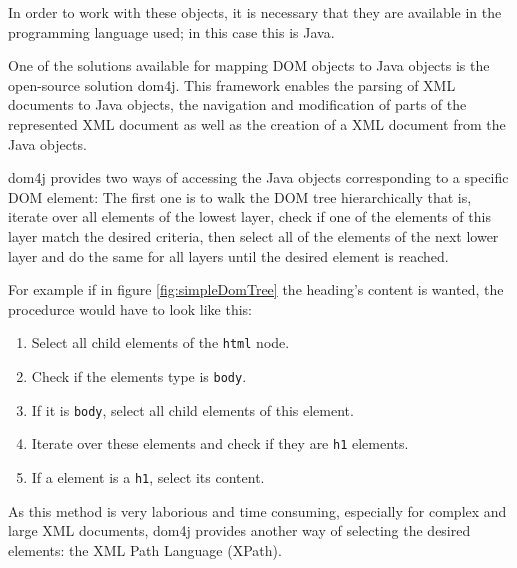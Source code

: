 In order to work with these objects, it is necessary that they are available in the programming language used; in this case this is Java.

One of the solutions available for mapping DOM objects to Java objects is the open-source solution dom4j. This framework enables the parsing of XML documents to Java objects, the navigation and modification of parts of the represented XML document as well as the creation of a XML document from the Java objects.

dom4j provides two ways of accessing the Java objects corresponding to a specific DOM element: The first one is to walk the DOM tree hierarchically that is, iterate over all elements of the lowest layer, check if one of the elements of this layer match the desired criteria, then select all of the elements of the next lower layer and do the same for all layers until the desired element is reached. 

For example if in figure \ref{fig:simpleDomTree} the heading's content is wanted, the procedurce would have to look like this:

\begin{enumerate}
\item Select all child elements of the \texttt{html} node.
\item Check if the elements type is \texttt{body}.
\item If it is \texttt{body}, select all child elements of this element.
\item Iterate over these elements and check if they are \texttt{h1} elements.
\item If a element is a \texttt{h1}, select its content.
\end{enumerate}

As this method is very laborious and time consuming, especially for complex and large XML documents, dom4j provides another way of selecting the desired elements: the XML Path Language (XPath).
